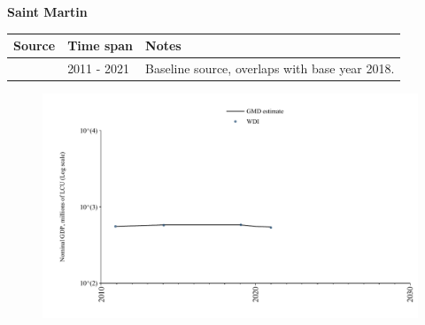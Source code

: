 \documentclass[12pt,a4paper,landscape]{article}
\begin{document}
\begin{adjustbox}{max totalsize={\paperwidth}{\paperheight},center}
\begin{minipage}[t][\textheight][t]{\textwidth}
\vspace*{0.5cm}
{}
\begin{center}
{\Large\bfseries Saint Martin}
\end{center}
\vspace{0.5cm}
\begin{table}[H]
\centering
\small
\begin{tabular}{|l|l|l|}
\hline
\textbf{Source} & \textbf{Time span} & \textbf{Notes} \\
\hline
\rowcolor{white}\cite{WDI}& 2011 - 2021 &Baseline source, overlaps with base year 2018.\\
\hline
\end{tabular}
\end{table}
\begin{figure}[H]
\centering
\includegraphics[width=\textwidth,height=0.6\textheight,keepaspectratio]{graphs/MAF_nGDP.pdf}
\end{figure}
\end{minipage}
\end{adjustbox}
\end{document}

